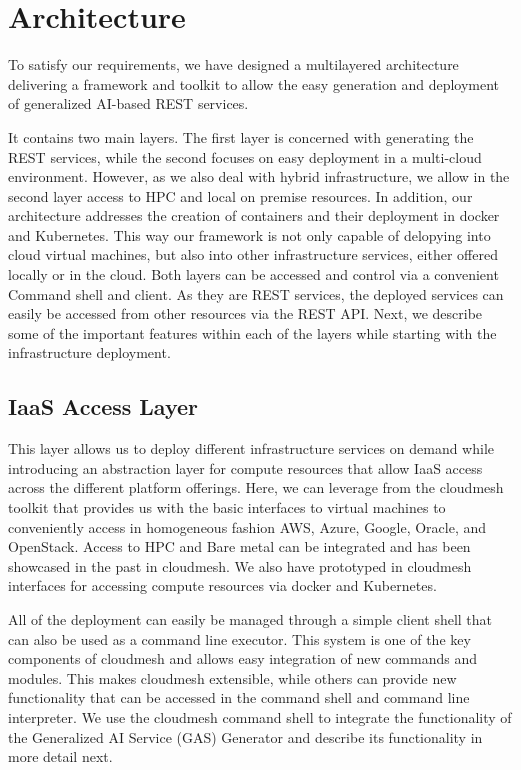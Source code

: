 \section{Architecture}
\label{sec:architecture}

To satisfy our requirements, we have designed a multilayered architecture delivering a framework and toolkit to allow the easy generation and deployment of generalized AI-based REST services. 

It contains two main layers. The first layer is concerned with generating the REST services, while the second focuses on easy deployment in a multi-cloud environment. However, as we also deal with hybrid infrastructure, we allow in the second layer access to HPC and local on premise resources. In addition, our architecture addresses the creation of containers and their deployment in docker and Kubernetes. This way our framework is not only capable of delopying into cloud virtual machines, but also into other infrastructure services, either offered locally or in the cloud. Both layers can be accessed and control via a convenient Command shell and client. As they are REST services, the deployed services can easily be accessed from other resources via the REST API. Next, we describe some of the important features within each of the layers while starting with the infrastructure deployment. 

\subsection{IaaS Access Layer}

This layer allows us to deploy different infrastructure services on demand while introducing an abstraction layer for compute resources that allow IaaS access across the different platform offerings. Here, we can leverage from the cloudmesh toolkit that provides us with the basic interfaces to virtual machines to conveniently access in homogeneous fashion AWS, Azure, Google, Oracle, and OpenStack. Access to HPC and Bare metal can be integrated and has been showcased in the past in cloudmesh. We also have prototyped in cloudmesh interfaces for accessing compute resources via docker and Kubernetes. 

All of the deployment can easily be managed through a simple client shell that can also be used as a command line executor. This system is one of the key components of cloudmesh and allows easy integration of new commands and modules. This makes cloudmesh extensible, while others can provide new functionality that can be accessed in the command shell and command line interpreter. We use the cloudmesh command shell to integrate the functionality of the Generalized AI Service (GAS) Generator and describe its functionality in more detail next.

